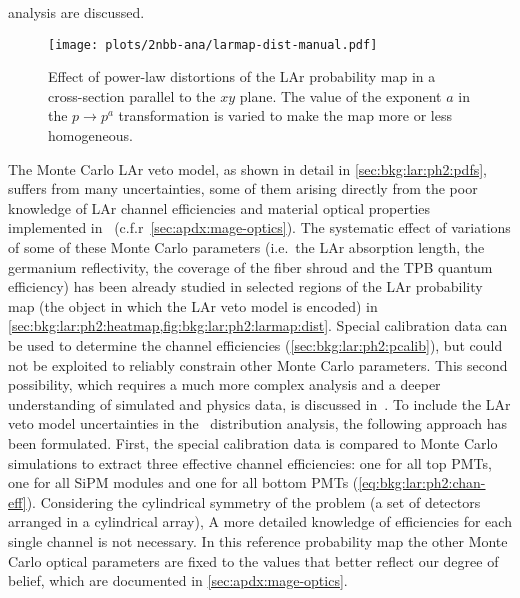 analysis are discussed.

\begin{description}[wide]

    \begin{figure}
      \centering
      \texttt{[image: plots/2nbb-ana/larmap-dist-manual.pdf]}
      \caption{%
        Effect of power-law distortions of the LAr probability map in a cross-section
        parallel to the $xy$ plane. The value of the exponent $a$ in the $p \rightarrow
        p^a$ transformation is varied to make the map more or less homogeneous.
      }\label{fig:2nbb-ana:larmap-dist-showoff}
    \end{figure}

  \item[LAr veto model] The Monte Carlo LAr veto model, as shown in detail in
    \cref{sec:bkg:lar:ph2:pdfs}, suffers from many uncertainties, some of them arising
    directly from the poor knowledge of LAr channel efficiencies and material optical
    properties implemented in \mage\ (c.f.r~\cref{sec:apdx:mage-optics}). The systematic
    effect of variations of some of these Monte Carlo parameters (i.e.~the LAr absorption
    length, the germanium reflectivity, the coverage of the fiber shroud and the TPB
    quantum efficiency) has been already studied in selected regions of the LAr
    probability map (the object in which the LAr veto model is encoded) in
    \cref{sec:bkg:lar:ph2:heatmap,fig:bkg:lar:ph2:larmap:dist}. Special calibration data
    can be used to determine the channel efficiencies (\cref{sec:bkg:lar:ph2:pcalib}), but
    could not be exploited to reliably constrain other Monte Carlo parameters. This second
    possibility, which requires a much more complex analysis and a deeper understanding of
    simulated and physics data, is discussed in~\cite{Wiesinger2021}.
    \newpar
    To include the LAr veto model uncertainties in the \nnbb\ distribution analysis, the
    following approach has been formulated. First, the special calibration data is
    compared to Monte Carlo simulations to extract three effective channel efficiencies:
    one for all top PMTs, one for all SiPM modules and one for all bottom PMTs
    (\cref{eq:bkg:lar:ph2:chan-eff}). Considering the cylindrical symmetry of the problem
    (a set of detectors arranged in a cylindrical array), A more detailed knowledge of
    efficiencies for each single channel is not necessary. In this reference probability
    map the other Monte Carlo optical parameters are fixed to the values that better
    reflect our degree of belief, which are documented in \cref{sec:apdx:mage-optics}.

\end{description}
